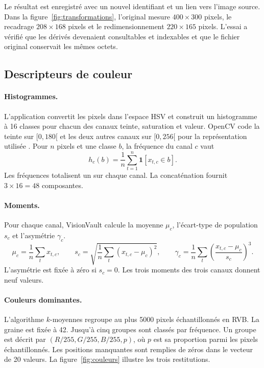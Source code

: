 Le résultat est enregistré avec un nouvel identifiant et un lien vers l'image source. Dans la figure~\ref{fig:transformations}, l'original mesure \(400\times300\) pixels, le recadrage \(208\times168\) pixels et le redimensionnement \(220\times165\) pixels. L'essai a vérifié que les dérivés devenaient consultables et indexables et que le fichier original conservait les mêmes octets.

\clearpage
\subsection{Descripteurs de couleur}
\paragraph{Histogrammes.}
L'application convertit les pixels dans l'espace HSV et construit un histogramme à 16 classes pour chacun des canaux teinte, saturation et valeur. OpenCV code la teinte sur \([0,180[\) et les deux autres canaux sur \([0,256[\) pour la représentation utilisée \cite{opencv}. Pour \(n\) pixels et une classe \(b\), la fréquence du canal \(c\) vaut
\begin{equation}
  h_c(b)=\frac{1}{n}\sum_{t=1}^{n}\mathbf{1}[x_{t,c}\in b].
  \label{eq:hsv}
\end{equation}
Les fréquences totalisent un sur chaque canal. La concaténation fournit \(3\times16=48\) composantes.

\paragraph{Moments.}
Pour chaque canal, VisionVault calcule la moyenne \(\mu_c\), l'écart-type de population \(s_c\) et l'asymétrie \(\gamma_c\).
\begin{equation}
  \mu_c=\frac1n\sum_t x_{t,c},\qquad
  s_c=\sqrt{\frac1n\sum_t(x_{t,c}-\mu_c)^2},\qquad
  \gamma_c=\frac1n\sum_t\left(\frac{x_{t,c}-\mu_c}{s_c}\right)^3 .
  \label{eq:moments}
\end{equation}
L'asymétrie est fixée à zéro si \(s_c=0\). Les trois moments des trois canaux donnent neuf valeurs.

\paragraph{Couleurs dominantes.}
L'algorithme \(k\)-moyennes regroupe au plus \num{5000} pixels échantillonnés en RVB. La graine est fixée à 42. Jusqu'à cinq groupes sont classés par fréquence. Un groupe est décrit par \((R/255,G/255,B/255,p)\), où \(p\) est sa proportion parmi les pixels échantillonnés. Les positions manquantes sont remplies de zéros dans le vecteur de 20 valeurs. La figure~\ref{fig:couleurs} illustre les trois restitutions.

